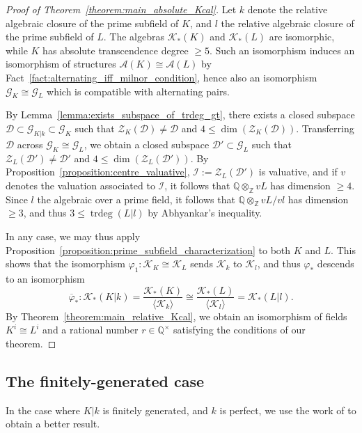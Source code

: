 \documentclass[12pt]{amsart}
\newcommand{\Zbb}{\mathbb{Z}}
\newcommand{\Qbb}{\mathbb{Q}}
\newcommand{\trdeg}{\operatorname{trdeg}}
\newcommand{\Ascr}{\mathscr{A}}
\newcommand{\Zcal}{\mathcal{Z}}
\newcommand{\Gcal}{\mathcal{G}}
\newcommand{\Dcal}{\mathcal{D}}
\newcommand{\Ical}{\mathcal{I}}
\newcommand{\Kcal}{\mathcal{K}}
\renewcommand{\bar}{\overline}
\renewcommand{\phi}{\varphi}
\theoremstyle{definition}
\begin{document}
\begin{proof}[Proof of Theorem~\ref{theorem:main_absolute_Kcal}]
  Let $k$ denote the relative algebraic closure of the prime subfield of $K$, and $l$ the relative algebraic closure of the prime subfield of $L$.
  The algebras $\Kcal_{*}(K)$ and $\Kcal_{*}(L)$ are isomorphic, while $K$ has absolute transcendence degree $\geq 5$.
  Such an isomorphism induces an isomorphism of structures $\Ascr(K) \cong \Ascr(L)$ by Fact~\ref{fact:alternating_iff_milnor_condition}, hence also an isomorphism $\Gcal_{K} \cong \Gcal_{L}$ which is compatible with alternating pairs.

  By Lemma~\ref{lemma:exists_subspace_of_trdeg_gt}, there exists a closed subspace $\Dcal \subset \Gcal_{K|k} \subset \Gcal_{K}$ such that $\Zcal_{K}(\Dcal) \neq \Dcal$ and $4 \le \dim(\Zcal_{K}(\Dcal))$.
  Transferring $\Dcal$ across $\Gcal_{K} \cong \Gcal_{L}$, we obtain a closed subspace $\Dcal' \subset \Gcal_{L}$ such that $\Zcal_{L}(\Dcal') \neq \Dcal'$ and $4 \le \dim(\Zcal_{L}(\Dcal'))$.
  By Proposition~\ref{proposition:centre_valuative}, $\Ical := \Zcal_{L}(\Dcal')$ is valuative, and if $v$ denotes the valuation associated to $\Ical$, it follows that $\Qbb \otimes_{\Zbb} vL$ has dimension $\geq 4$.
  Since $l$ the algebraic over a prime field, it follows that $\Qbb \otimes_{\Zbb} vL/vl$ has dimension $\geq 3$, and thus $3 \le \trdeg(L|l)$ by Abhyankar's inequality.

  In any case, we may thus apply Proposition~\ref{proposition:prime_subfield_characterization} to both $K$ and $L$.
  This shows that the isomorphism $\phi_{1} : \Kcal_{K} \cong \Kcal_{L}$ sends $\Kcal_{k}$ to $\Kcal_{l}$, and thus $\phi_{*}$ descends to an isomorphism
  \[ \bar\phi_{*} : \Kcal_{*}(K|k) = \frac{\Kcal_{*}(K)}{ \langle \Kcal_{k} \rangle} \cong \frac{\Kcal_{*}(L)}{\langle \Kcal_{l} \rangle} = \Kcal_{*}(L|l). \]
  By Theorem~\ref{theorem:main_relative_Kcal}, we obtain an isomorphism of fields $K^{i} \cong L^{i}$ and a rational number $r \in \Qbb^{\times}$ satisfying the conditions of our theorem.
\end{proof}

\subsection{The finitely-generated case}

In the case where $K|k$ is finitely generated, and $k$ is perfect, we use the work of \cite{zbMATH07463742} to obtain a better result.
\end{document}
